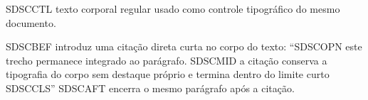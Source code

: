 \documentclass{abntexto-ufc}
\begin{document}
\textual

\noindent SDSCCTL texto corporal regular usado como controle tipográfico do mesmo documento.

\noindent SDSCBEF introduz uma citação direta curta no corpo do texto: \enquote{SDSCOPN este trecho permanece integrado ao parágrafo. SDSCMID a citação conserva a tipografia do corpo sem destaque próprio e termina dentro do limite curto SDSCCLS} SDSCAFT encerra o mesmo parágrafo após a citação.
\end{document}
